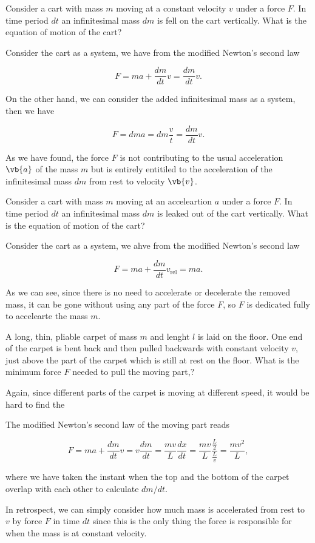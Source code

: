 \documentclass[a4paper,12pt]{report}
\begin{document}
{Consider a cart with mass \(m\) moving at a constant velocity \(v\) under a force \(F\). In time period \(dt\) an infinitesimal mass \(dm\) is fell on the cart vertically. What is the equation of motion of the cart?}
{Consider the cart as a system, we have from the modified Newton's second law 

\begin{equation}
	F = ma + \frac{dm}{dt} v = \frac{dm}{dt}v.  
\end{equation}

On the other hand, we can consider the added infinitesimal mass as a system, then we have 

\begin{equation}
	F = dm a = dm \frac{v}{t} = \frac{dm}{dt}v.   
\end{equation}

As we have found, the force \(F\) is not contributing to the usual acceleration \(\vb{a} \) of the mass \(m\) but is entirely entitiled to the acceleration of the infinitesimal mass \(dm\) from rest to velocity \(\vb{v} \).  
} 

{Consider a cart with mass \(m\) moving at an acceleartion \(a\) under a force \(F\). In time period \(dt\) an infinitesimal mass \(dm\) is leaked out of the cart vertically. What is the equation of motion of the cart? }
{Consider the cart as a system, we ahve from the modified Newton's second law

\begin{equation}
	F = ma + \frac{dm}{dt} v_{\text{rel} } = ma. 
\end{equation}

As we can see, since there is no need to accelerate or decelerate the removed mass, it can be gone without using any part of the force \(F\), so \(F\) is dedicated fully to accelearte the mass \(m\). 
} 

{A long, thin, pliable carpet of mass \(m\) and lenght \(l\) is laid on the floor. One end of the carpet is bent back and then pulled backwards with constant velocity \(v\), just above the part of the carpet which is still at rest on the floor. What is the minimum force \(F\) needed to pull the moving part,?}
{Again, since different parts of the carpet is moving at different speed, it would be hard to find the 

The modified Newton's second law of the moving part reads

\begin{equation}
	F = ma + \frac{dm}{dt} v = v \frac{dm}{dt} = \frac{mv}{L} \frac{dx}{dt} = \frac{mv}{L} \frac{\frac{L}{2} }{\frac{L}{v} } = \frac{mv^2}{L},    
\end{equation}

where we have taken the instant when the top and the bottom of the carpet overlap with each other to calculate \(dm /dt\).

In retrospect, we can simply consider how much mass is accelerated from rest to \(v\) by force \(F\) in time \(dt\) since this is the only thing the force is responsible for when the mass is at constant velocity.

} 
\end{document}
